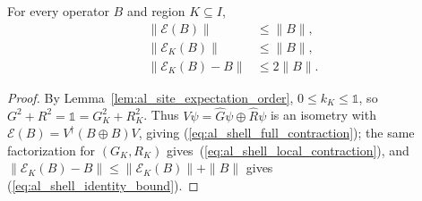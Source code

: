 \begin{lemma}
    \label{thm:al_root_channel_contraction}
    \leanok
    For every operator $B$ and region $K\subseteq I$,
    \begin{align}
        \|\mathcal E(B)\|     & \le\|B\|,  \label{eq:al_shell_full_contraction}  \\
        \|\mathcal E_K(B)\|   & \le\|B\|,  \label{eq:al_shell_local_contraction} \\
        \|\mathcal E_K(B)-B\| & \le2\|B\|. \label{eq:al_shell_identity_bound}
    \end{align}
\end{lemma}
\begin{proof}
    \leanok
    By Lemma~\ref{lem:al_site_expectation_order}, $0\le k_K\le\mathbb 1$, so
    $G^2+R^2=\mathbb 1=G_K^2+R_K^2$. Thus $V\psi=\widehat G\psi\oplus\widehat R\psi$
    is an isometry with $\mathcal E(B)=V^\dagger(B\oplus B)V$, giving
    (\ref{eq:al_shell_full_contraction}); the same factorization for
    $(G_K,R_K)$ gives~(\ref{eq:al_shell_local_contraction}), and
    $\|\mathcal E_K(B)-B\|\le\|\mathcal E_K(B)\|+\|B\|$ gives
    (\ref{eq:al_shell_identity_bound}).
\end{proof}

